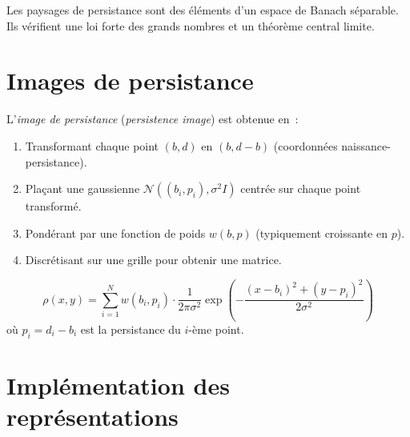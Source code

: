 \begin{theoreme}[Bubenik, 2015]
Les paysages de persistance sont des \'el\'ements d'un espace de Banach
s\'eparable. Ils v\'erifient une loi forte des grands nombres et un
th\'eor\`eme central limite.
\end{theoreme}

\section{Images de persistance}

\begin{definition}
L'\emph{image de persistance} (\emph{persistence image}) est obtenue
en~:
\begin{enumerate}
  \item Transformant chaque point $(b, d)$ en $(b, d-b)$ (coordonn\'ees
        naissance-persistance).
  \item Pla\c{c}ant une gaussienne $\mathcal{N}((b_i, p_i), \sigma^2 I)$
        centr\'ee sur chaque point transform\'e.
  \item Pond\'erant par une fonction de poids $w(b, p)$ (typiquement
        croissante en $p$).
  \item Discr\'etisant sur une grille pour obtenir une matrice.
\end{enumerate}
\end{definition}

\begin{formules}[title=\textbf{Image de persistance}]
\[
  \rho(x, y) = \sum_{i=1}^{N} w(b_i, p_i) \cdot
  \frac{1}{2\pi\sigma^2}
  \exp\left(-\frac{(x - b_i)^2 + (y - p_i)^2}{2\sigma^2}\right)
\]
o\`u $p_i = d_i - b_i$ est la persistance du $i$-\`eme point.
\end{formules}

\section{Impl\'ementation des repr\'esentations}

